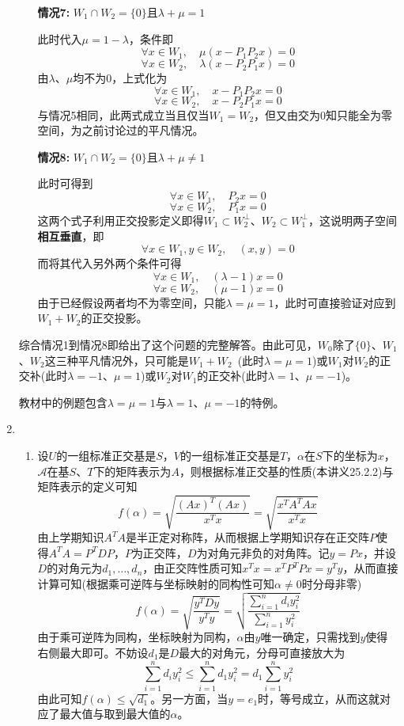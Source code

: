 \documentclass[a4paper,UTF8,fontset=windows,AutoFakeBold]{ctexart}
\newcommand*{\ma}{\mathcal{A}}
\newcommand*{\note}{\noindent *}
\begin{document}
\begin{enumerate}
    \begin{itemize}
        \item[\textbf{情况7:}] $W_1\cap W_2=\{0\}$且$\lambda+\mu=1$
            
        此时代入$\mu=1-\lambda$，条件即
        $$\forall x\in W_1,\quad \mu(x-P_1P_2x)=0$$
        $$\forall x\in W_2,\quad \lambda(x-P_2P_1x)=0$$
        由$\lambda$、$\mu$均不为0，上式化为
        $$\forall x\in W_1,\quad x-P_1P_2x=0$$
        $$\forall x\in W_2,\quad x-P_2P_1x=0$$
        与情况5相同，此两式成立当且仅当$W_1=W_2$，但又由交为0知只能全为零空间，为之前讨论过的平凡情况。

        \item[\textbf{情况8:}] $W_1\cap W_2=\{0\}$且$\lambda+\mu\ne1$
        
        此时可得到
        $$\forall x\in W_1,\quad P_2x=0$$
        $$\forall x\in W_2,\quad P_1x=0$$
        这两个式子利用正交投影定义即得$W_1\subset W_2^\bot$、$W_2\subset W_1^\bot$，这说明两子空间\textbf{相互垂直}，即
        $$\forall x\in W_1,y\in W_2,\quad(x,y)=0$$
        而将其代入另外两个条件可得
        $$\forall x\in W_1,\quad(\lambda-1)x=0$$
        $$\forall x\in W_2,\quad(\mu-1)x=0$$
        由于已经假设两者均不为零空间，只能$\lambda=\mu=1$，此时可直接验证对应到$W_1+W_2$的正交投影。
    \end{itemize}

    综合情况1到情况8即给出了这个问题的完整解答。由此可见，$W_0$除了$\{0\}$、$W_1$、$W_2$这三种平凡情况外，只可能是$W_1+W_2$\ (此时$\lambda=\mu=1$)或$W_1$对$W_2$的正交补(此时$\lambda=-1$、$\mu=1$)或$W_2$对$W_1$的正交补(此时$\lambda=1$、$\mu=-1$)。

    \note 教材中的例题包含$\lambda=\mu=1$与$\lambda=1$、$\mu=-1$的特例。

    \item
    \begin{enumerate}
        \item 设$U$的一组标准正交基是$S$，$V$的一组标准正交基是$T$，$\alpha$在$S$下的坐标为$x$，$\ma$在基$S$、$T$下的矩阵表示为$A$，则根据标准正交基的性质(本讲义25.2.2)与矩阵表示的定义可知
        $$f(\alpha)=\sqrt{\frac{(Ax)^T(Ax)}{x^Tx}}=\sqrt{\frac{x^TA^TAx}{x^Tx}}$$
        由上学期知识$A^TA$是半正定对称阵，从而根据上学期知识存在正交阵$P$使得$A^TA=P^TDP$，$P$为正交阵，$D$为对角元非负的对角阵。记$y=Px$，并设$D$的对角元为$d_1,\dots,d_n$，由正交阵性质可知$x^Tx=x^TP^TPx=y^Ty$，从而直接计算可知(根据乘可逆阵与坐标映射的同构性可知$\alpha\ne0$时分母非零)
        $$f(\alpha)=\sqrt{\frac{y^TDy}{y^Ty}}=\sqrt{\frac{\sum_{i=1}^nd_iy_i^2}{\sum_{i=1}^ny_i^2}}$$
        由于乘可逆阵为同构，坐标映射为同构，$\alpha$由$y$唯一确定，只需找到$y$使得右侧最大即可。不妨设$d_1$是$D$最大的对角元，分母可直接放大为
        $$\sum_{i=1}^nd_iy_i^2\le\sum_{i=1}^nd_1y_i^2=d_1\sum_{i=1}^ny_i^2$$
        由此可知$f(\alpha)\le\sqrt{d_1}$。另一方面，当$y=e_1$时，等号成立，从而这就对应了最大值与取到最大值的$\alpha$。


\end{enumerate}
\end{enumerate}
\end{document}
